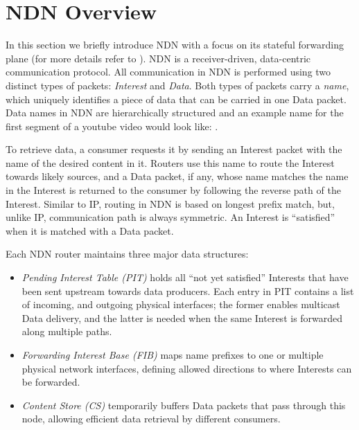 \section{NDN Overview\label{sec:ccn-intro}}

In this section we briefly introduce NDN with a focus on its stateful forwarding plane (for more details refer to \cite{ndn-conext, ndn-tr, adaptive-forwarding}).
NDN is a receiver-driven, data-centric communication protocol.
All communication in NDN is performed using two distinct types of packets: \textit{Interest} and \textit{Data}. Both types of packets carry a \textit{name}, which uniquely identifies a piece of data that can be carried in one Data packet. 
Data names in NDN are hierarchically structured and an example name for the first segment of a youtube video would look like: .

To retrieve data, a consumer requests it by sending an Interest packet with the name of the desired content in it.
Routers use this name to route the Interest towards likely sources, and a Data packet, if any, whose name matches the name in the Interest is returned to the consumer by following the reverse path of the Interest. Similar to IP, routing in NDN is based on longest prefix match, but, unlike IP,  communication path is always symmetric. An Interest is ``satisfied'' when it is matched with a Data packet.

Each NDN router maintains three major data structures:
\begin{itemize}
\item \textit{Pending Interest Table (PIT)} holds all ``not yet satisfied'' Interests that have been sent upstream towards data producers. Each entry in PIT contains a list of incoming, and outgoing physical interfaces; the former enables multicast Data delivery, and the latter is needed when the same Interest is forwarded along multiple paths.
\item \textit{Forwarding Interest Base (FIB)} maps name prefixes to one or multiple physical network interfaces, defining allowed %
 directions to where Interests can be forwarded. 
\item \textit{Content Store (CS)} temporarily buffers Data packets that pass through this node, allowing efficient data retrieval by different consumers.
\end{itemize}

